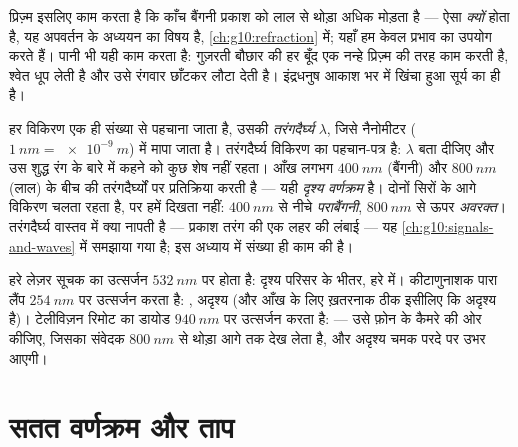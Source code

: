 \begin{remark}[प्रिज़्म और बारिश की बूँदें]\label{rem:g10:light-spectra:rainbow}
प्रिज़्म इसलिए काम करता है कि काँच बैंगनी प्रकाश को लाल से थोड़ा अधिक
मोड़ता है --- ऐसा \emph{क्यों} होता है, यह अपवर्तन के अध्ययन का विषय है,
\cref{ch:g10:refraction} में; यहाँ हम केवल प्रभाव का उपयोग करते हैं। पानी भी यही काम करता
है: गुज़रती बौछार की हर बूँद एक नन्हे प्रिज़्म की तरह काम करती है, श्वेत
धूप लेती है और उसे रंगवार छाँटकर लौटा देती है। इंद्रधनुष आकाश भर में खिंचा
हुआ सूर्य का  ही है।
\end{remark}

\begin{definition}[तरंगदैर्घ्य, किसी विकिरण का पहचान-पत्र]\label{def:g10:light-spectra:wavelength}
हर  विकिरण एक ही संख्या से पहचाना जाता है, उसकी
\emph{तरंगदैर्घ्य} $\lambda$, जिसे नैनोमीटर ($\qty{1}{nm} = \qty{e-9}{m}$) में
मापा जाता है। तरंगदैर्घ्य विकिरण का पहचान-पत्र है: $\lambda$ बता दीजिए और
उस शुद्ध रंग के बारे में कहने को कुछ शेष नहीं रहता। आँख लगभग $\qty{400}{nm}$
(बैंगनी) और $\qty{800}{nm}$ (लाल) के बीच की तरंगदैर्घ्यों पर प्रतिक्रिया करती है
--- यही \emph{दृश्य वर्णक्रम} है। दोनों सिरों के
आगे विकिरण चलता रहता है, पर हमें दिखता नहीं: $\qty{400}{nm}$ से नीचे
\emph{पराबैंगनी}, $\qty{800}{nm}$ से ऊपर
\emph{अवरक्त}। तरंगदैर्घ्य वास्तव में क्या नापती है ---
प्रकाश तरंग की एक लहर की लंबाई --- यह \cref{ch:g10:signals-and-waves} में समझाया गया है; इस
अध्याय में संख्या ही काम की है।
\end{definition}

\begin{example}[तरंगदैर्घ्य पढ़ना]\label{ex:g10:light-spectra:classify}
हरे लेज़र सूचक का उत्सर्जन $\qty{532}{nm}$ पर होता है: दृश्य परिसर के भीतर, हरे
में। कीटाणुनाशक पारा लैंप $\qty{254}{nm}$ पर उत्सर्जन करता है: ,
अदृश्य (और आँख के लिए ख़तरनाक ठीक इसीलिए कि अदृश्य है)। टेलीविज़न रिमोट
का डायोड $\qty{940}{nm}$ पर उत्सर्जन करता है:  --- उसे फ़ोन के
कैमरे की ओर कीजिए, जिसका संवेदक $\qty{800}{nm}$ से थोड़ा आगे तक देख लेता है, और
अदृश्य चमक परदे पर उभर आएगी।
\end{example}

\section{सतत वर्णक्रम और ताप}

